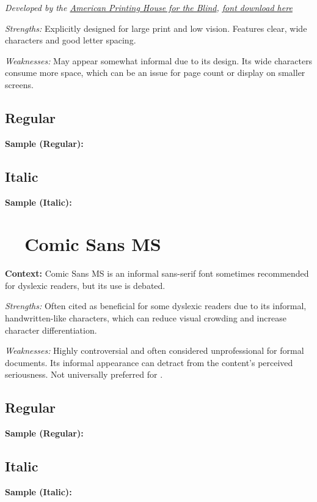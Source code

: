 \emph{Developed by the \href{https://www.aph.org/resources/large-print-guidelines/}{American Printing House for the Blind}, \href{https://www.aph.org/resources/large-print-guidelines/}{font download here}}
\begin{raggedright}
	\emph{Strengths:} Explicitly designed for large print and low vision. Features clear, wide characters and good letter spacing.

	\emph{Weaknesses:} May appear somewhat informal due to its design. Its wide characters consume more space, which can be an issue for page count or display on smaller screens.

	\subsection{Regular}
	\noindent\textbf{Sample (Regular):}
	\FontSample{\aphontfont}

	\subsection{Italic}
	\noindent\textbf{Sample (Italic):}
	\FontSample{{\aphontfont\itshape}}
\end{raggedright}


\pagebreak
\section{~~Comic Sans MS}\label{app5:trouble9}
\noindent
\textbf{Context:} Comic Sans MS is an informal sans-serif font sometimes recommended for dyslexic readers, but its use is debated.

\begin{raggedright}
	\emph{Strengths:} Often cited as beneficial for some dyslexic readers due to its informal, handwritten-like characters, which can reduce visual crowding and increase character differentiation.

	\emph{Weaknesses:} Highly controversial and often considered unprofessional for formal documents. Its informal appearance can detract from the content's perceived seriousness. Not universally preferred for .

	\subsection{Regular}
	\noindent\textbf{Sample (Regular):}
	\FontSample{\comicsansfont}

	\subsection{Italic}
	\noindent\textbf{Sample (Italic):}
	\FontSample{{\comicsansfont\itshape}}
\end{raggedright}


